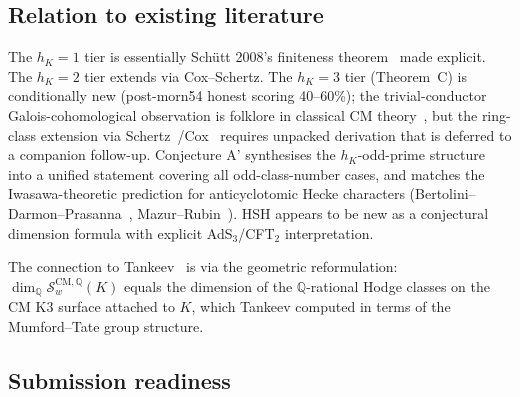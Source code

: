\documentclass[11pt,a4paper]{amsart}
\theoremstyle{definition}
\newcommand{\Q}{\mathbb{Q}}
\newcommand{\Scal}{\mathcal{S}}
\newcommand{\hK}{h_{K}}
\begin{document}
\subsection{Relation to existing literature}\label{sec:conclusion-lit-v4}

The $\hK = 1$ tier is essentially Sch\"utt 2008's finiteness theorem~\cite{Schutt2008} made explicit. The $\hK = 2$ tier extends via Cox--Schertz. The $\hK = 3$ tier (Theorem~C) is conditionally new (post-morn54 honest scoring 40--60\%); the trivial-conductor Galois-cohomological observation is folklore in classical CM theory~\cite{Ribet1977, Schertz2010}, but the ring-class extension via Schertz~\cite[Ch.~6]{Schertz2010}/Cox~\cite[Ch.~9]{Cox2013} requires unpacked derivation that is deferred to a companion follow-up. Conjecture A' synthesises the $\hK$-odd-prime structure into a unified statement covering all odd-class-number cases, and matches the Iwasawa-theoretic prediction for anticyclotomic Hecke characters (Bertolini--Darmon--Prasanna~\cite{BDP2013}, Mazur--Rubin~\cite{MazurRubin2004}). HSH appears to be new as a conjectural dimension formula with explicit AdS$_3$/CFT$_2$ interpretation.

The connection to Tankeev~\cite{Tankeev1982} is via the geometric reformulation: $\dim_\Q \Scal_w^{\mathrm{CM},\Q}(K)$ equals the dimension of the $\Q$-rational Hodge classes on the CM K3 surface attached to $K$, which Tankeev computed in terms of the Mumford--Tate group structure.

\subsection{Submission readiness}\label{sec:submission-v4}
\end{document}
